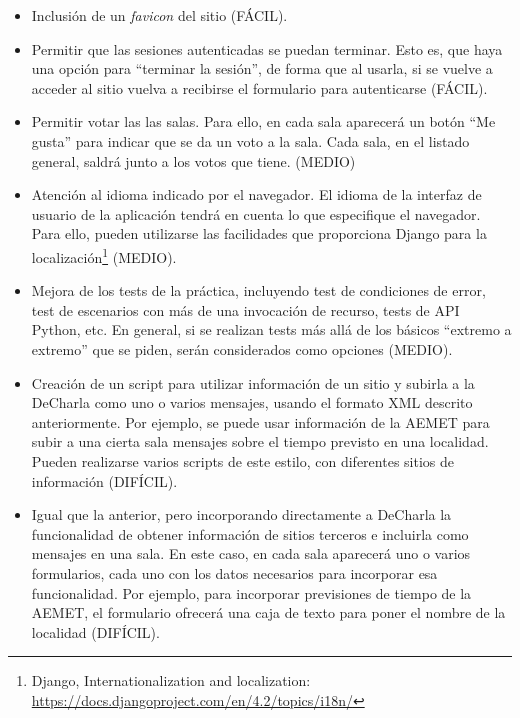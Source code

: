 \begin{itemize}
  \item Inclusión de un \emph{favicon} del sitio (FÁCIL).

  \item Permitir que las sesiones autenticadas se puedan terminar. Esto es, que haya una opción para ``terminar la sesión'', de forma que al usarla, si se vuelve a acceder al sitio vuelva a recibirse el formulario para autenticarse (FÁCIL).

  \item Permitir votar las las salas. Para ello, en cada sala aparecerá un botón ``Me gusta'' para indicar que se da un voto a la sala. Cada sala, en el listado general, saldrá junto a los votos que tiene. (MEDIO)
        
  \item Atención al idioma indicado por el navegador. El idioma de la interfaz de usuario de la aplicación tendrá en cuenta lo que especifique el navegador. Para ello, pueden utilizarse las facilidades que proporciona Django para la localización\footnote{Django, Internationalization and localization: \\ \url{https://docs.djangoproject.com/en/4.2/topics/i18n/} } (MEDIO).
    
  \item Mejora de los tests de la práctica, incluyendo test de condiciones de error, test de escenarios con más de una invocación de recurso, tests de API Python, etc. En general, si se realizan tests más allá de los básicos ``extremo a extremo'' que se piden, serán considerados como opciones (MEDIO).


  \item Creación de un script para utilizar información de un sitio y subirla a la DeCharla como uno o varios mensajes, usando el formato XML descrito anteriormente. Por ejemplo, se puede usar información de la AEMET para subir a una cierta sala mensajes sobre el tiempo previsto en una localidad. Pueden realizarse varios scripts de este estilo, con diferentes sitios de información (DIFÍCIL).

  \item Igual que la anterior, pero incorporando directamente a DeCharla la funcionalidad de obtener información de sitios terceros e incluirla como mensajes en una sala. En este caso, en cada sala aparecerá uno o varios formularios, cada uno con los datos necesarios para incorporar esa funcionalidad. Por ejemplo, para incorporar previsiones de tiempo de la AEMET, el formulario ofrecerá una caja de texto para poner el nombre de la localidad (DIFÍCIL).
\end{itemize}

